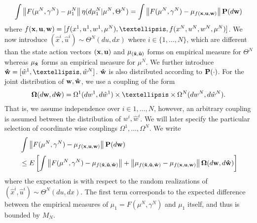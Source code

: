 \documentclass[twoside,11pt]{article}
\begin{document}
\begin{align*}
 \int \left\| F(\mu^N,\gamma^N) - \mu_1^N\right\| \eta(d\mu_1^N|\mu^N,\Theta^N)  = \int \left\|  F(\mu^N,\gamma^N) -\mu_{f(\bf x,u,w)}\right\| {\bf P}(d{\bf w})
\end{align*}
where $f({\bf x,u,w}) = [f(x^1,u^1,w^1,\mu^N),\dots,f(x^N,u^N,w^N,\mu^N ) ]$. We now introduce $(\hat{x}^i,\hat{u}^i) \sim \Theta^N(du,dx)$ where  $i\in\{1,\dots,N\}$, which are different than the state action vectors ${\bf(x,u)}$ and $\mu_{\bf (\hat{x},\hat{u})}$ forms on empirical measure for  $\Theta^N$ whereas $\mu_{\bf \hat{x}}$ forms an empirical measure for $\mu^N$. We further introduce ${\bf \hat{w}} = [\hat{w}^1,\dots,\hat{w}^N]$.  ${\bf \hat{w}}$ is also distributed according to ${\bf P}(\cdot)$. For the joint distribution of ${\bf w,\hat{w}}$, we use a coupling of the form
\begin{align*}
{\bf \Omega}(d {\bf w},d{\bf \hat{w}}) = \Omega^1(dw^1 ,d\hat{w}^1)\times \dots \times \Omega^N(dw^N,d\hat{w}^N).
 \end{align*}
That is, we assume independence over $i\in{1,\dots,N}$, however, an arbitrary coupling is assumed between the distribution of $w^i,\hat{w}^i$.  We will later specify the particular selection of coordinate wise couplings  $\Omega^1,\dots,\Omega^N$. We write
\begin{align*}
& \int \left\|  F(\mu^N,\gamma^N) -\mu_{f(\bf x,u,w)}\right\| {\bf P}(d{\bf w}) \\
&\leq  E\left[  \int \left\|  F(\mu^N,\gamma^N) - \mu_{f ({\bf \hat{x},\hat{u},\hat{w}})}\right\|   +   \left\|   \mu_{f ({\bf \hat{x},\hat{u},\hat{w}})} -   \mu_{f(\bf x,u,w)}\right\| {\bf \Omega}(d{\bf w}, d{\bf \hat{w}})  \right]
\end{align*}
where the expectation is with respect to the random realizations of $(\hat{x}^i, \hat{u}^i)\sim \Theta^N(du,dx)$. The first term corresponds to the expected difference between the empirical measures of $\mu_1=F(\mu^N,\gamma^N)$ and $\mu_1$ itself, and thus is bounded by $M_N$.
\end{document}
